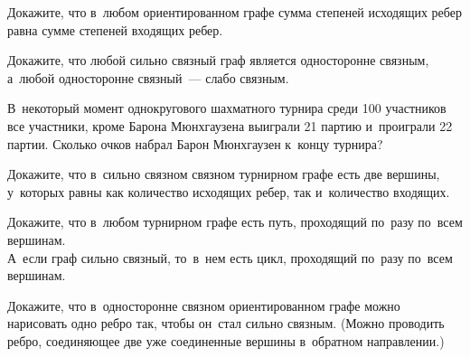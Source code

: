 \begin{problems}

\item
Докажите, что в~любом ориентированном графе сумма степеней исходящих ребер
равна сумме степеней входящих ребер.

\item
Докажите, что любой сильно связный граф является односторонне связным,
а~любой односторонне связный~--- слабо связным.

\item
В~некоторый момент однокругового шахматного турнира среди 100 участников все
участники, кроме Барона Мюнхгаузена выиграли 21 партию и~проиграли 22 партии.
Сколько очков набрал Барон Мюнхгаузен к~концу турнира?

\item
Докажите, что в~сильно связном связном турнирном графе есть две вершины,
у~которых равны как количество исходящих ребер, так и~количество входящих.

\item
\sbp
Докажите, что в~любом турнирном графе есть путь, проходящий по~разу по~всем
вершинам.
\\
\sbp
А~если граф сильно связный, то~в~нем есть цикл, проходящий по~разу по~всем
вершинам.

\item
Докажите, что в~односторонне связном ориентированном графе можно нарисовать
одно ребро так, чтобы он~стал сильно связным.
(Можно проводить ребро, соединяющее две уже соединенные вершины в~обратном
направлении.)

\end{problems}

